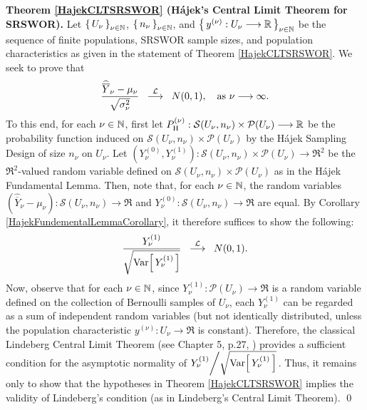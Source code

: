 \vskip 0.5cm
\proofof \textbf{Theorem \ref{HajekCLTSRSWOR} (H\'ajek's Central Limit Theorem for SRSWOR).}
\vskip 0.2cm
\noindent
Let $\left\{\,U_{\nu}\,\right\}_{\nu\in\N}$, $\left\{\,n_{\nu}\,\right\}_{\nu\in\N}$, and
$\left\{\,y^{(\nu)} : U_{\nu} \longrightarrow \Re\,\right\}_{\nu\in\N}$
be the sequence of finite populations, SRSWOR sample sizes, and
population characteristics
as given in the statement of Theorem \ref{HajekCLTSRSWOR}.
We seek to prove that
\begin{equation*}
\dfrac{\widehat{\overline{Y}}_{\nu} - \mu_{\nu}}{\sqrt{\sigma^{2}_{\nu}}}
\;\;\overset{\mathcal{L}}{\longrightarrow}\;\;
N(0,1),
\quad
\textnormal{as $\nu\longrightarrow\infty$}.
\end{equation*}
To this end, for each $\nu \in \N$, first let 
$P_{\textnormal{H}}^{(\nu)} : \mathcal{S}(U_{\nu},n_{\nu}) \times \mathcal{P}(U_{\nu}) \longrightarrow \Re$
be the probability function induced on $\mathcal{S}(U_{\nu},n_{\nu}) \times \mathcal{P}(U_{\nu})$
by the H\'ajek Sampling Design of size $n_{\nu}$ on $U_{\nu}$.
Let $\left(Y^{(0)}_{\nu},Y^{(1)}_{\nu}\right) : \mathcal{S}(U_{\nu},n_{\nu}) \times \mathcal{P}(U_{\nu}) \longrightarrow\Re^{2}$
be the $\Re^{2}$-valued random variable defined on $\mathcal{S}(U_{\nu},n_{\nu}) \times \mathcal{P}(U_{\nu})$
as in the H\'ajek Fundamental Lemma.
Then, note that, for each $\nu\in\N$, the random variables
$\left(\widehat{\overline{Y}}_{\nu} - \mu_{\nu}\right) : \mathcal{S}(U_{\nu},n_{\nu}) \longrightarrow \Re$ and
$Y^{(0)}_{\nu} : \mathcal{S}(U_{\nu},n_{\nu}) \longrightarrow \Re$
are equal.
By Corollary \ref{HajekFundementalLemmaCorollary}, it therefore suffices to show the following:
\begin{equation*}
\dfrac{Y^{(1)}_{\nu}}{\sqrt{\Var\!\left[\,Y^{(1)}_{\nu}\,\right]}} \;\; \overset{\mathcal{L}}{\longrightarrow} \;\; N(0,1).
\end{equation*}
Now, observe that for each $\nu\in\N$,
since $Y^{(1)}_{\nu} : \mathcal{P}(U_{\nu}) \longrightarrow \Re$ is a random variable
defined on the collection of Bernoulli samples of $U_{\nu}$,
each $Y^{(1)}_{\nu}$ can be regarded as a sum of independent random variables
(but not identically distributed, unless the population characteristic
$y^{(\nu)} : U_{\nu} \longrightarrow \Re$ is constant).
Therefore, the classical Lindeberg Central Limit Theorem
(see Chapter 5, p.27, \cite{Ferguson1996})
provides a sufficient condition for
the asymptotic normality of $Y^{(1)}_{\nu}\!\left/\sqrt{\Var\!\left[\,Y^{(1)}_{\nu}\,\right]}\right.$.
Thus, it remains only to show that the hypotheses in Theorem \ref{HajekCLTSRSWOR}
implies the validity of Lindeberg's condition (as in Lindeberg's Central Limit Theorem).
\qed

